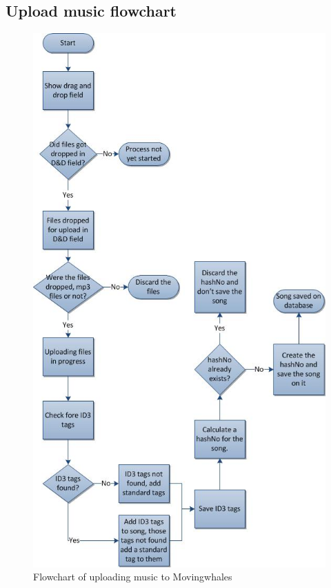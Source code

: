 \subsection{Upload music flowchart}%

\begin{figure}[h!]
\centering
\includegraphics[scale=0.5]{design/figures/uploadmusic_flowchart}
\caption{Flowchart of uploading music to Movingwhales}
\end{figure}%

